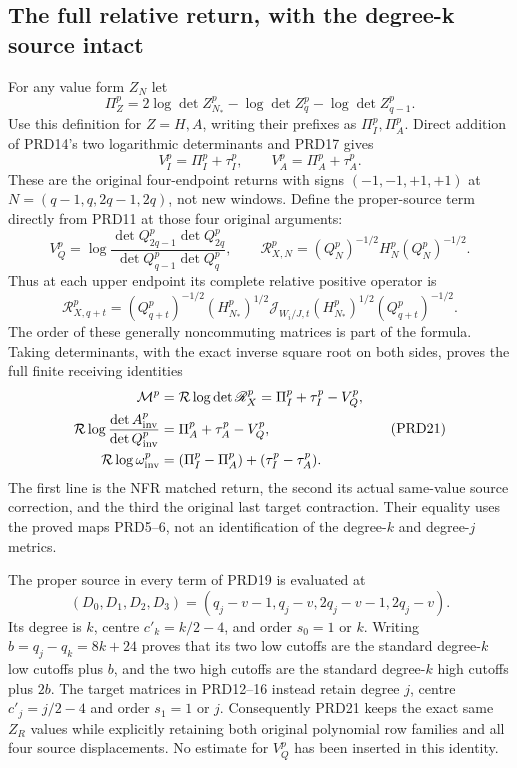 \documentclass[11pt,a4paper]{article}
\begin{document}
\subsection{The full relative return, with the degree-k source intact}
For any value form $Z_N$ let
\[
 \Pi_Z^p=2\log\det Z_{N_*}^p-\log\det Z_q^p
                            -\log\det Z_{q-1}^p.
                                                               \tag{PRD17}
\]
Use this definition for $Z=H,A$, writing their prefixes as
$\Pi_I^p,\Pi_A^p$. Direct addition of PRD14's two logarithmic
determinants and PRD17 gives
\[
 V_I^p=\Pi_I^p+\tau_I^p,\qquad
 V_A^p=\Pi_A^p+\tau_A^p.                                \tag{PRD18}
\]
These are the original four-endpoint returns with signs
$(-1,-1,+1,+1)$ at $N=(q-1,q,2q-1,2q)$, not new windows.
Define the proper-source term directly from PRD11 at those four
original arguments:
\[
 V_Q^p=\log\frac{\det Q_{2q-1}^p\det Q_{2q}^p}
                         {\det Q_{q-1}^p\det Q_q^p},
 \qquad \mathscr R_{X,N}^p=(Q_N^p)^{-1/2}H_N^p(Q_N^p)^{-1/2}.
                                                               \tag{PRD19}
\]
Thus at each upper endpoint its complete relative positive operator is
\[
 \mathscr R_{X,q+t}^p
 =(Q_{q+t}^p)^{-1/2}(H_{N_*}^p)^{1/2}
 \mathcal J_{W_i/J,t}(H_{N_*}^p)^{1/2}(Q_{q+t}^p)^{-1/2}.
                                                               \tag{PRD20}
\]
The order of these generally noncommuting matrices is part of the
formula. Taking determinants, with the exact inverse square root
on both sides, proves the full finite receiving identities
\[
\begin{aligned}
 \mathcal M^p&=\mathcal R\log\det\mathscr R_X^p
                 =\Pi_I^p+\tau_I^p-V_Q^p,\\
 \mathcal R\log\frac{\det A_{\rm inv}^p}{\det Q_{\rm inv}^p}
               &=\Pi_A^p+\tau_A^p-V_Q^p,\\
 \mathcal R\log\omega_{\rm inv}^p
               &=(\Pi_I^p-\Pi_A^p)+(\tau_I^p-\tau_A^p).
\end{aligned}                                                    \tag{PRD21}
\]
The first line is the NFR matched return, the second its actual
same-value source correction, and the third the original last
target contraction. Their equality uses the proved maps PRD5--6,
not an identification of the degree-$k$ and degree-$j$ metrics.

The proper source in every term of PRD19 is evaluated at
\[
 (D_0,D_1,D_2,D_3)=(q_j-v-1,q_j-v,2q_j-v-1,2q_j-v).
                                                               \tag{PRD22}
\]
Its degree is $k$, centre $c'_k=k/2-4$, and order $s_0=1$ or $k$.
Writing $b=q_j-q_k=8k+24$ proves that its two low cutoffs are
the standard degree-$k$ low cutoffs plus $b$, and the two high
cutoffs are the standard degree-$k$ high cutoffs plus $2b$.
The target matrices in PRD12--16 instead retain degree $j$,
centre $c'_j=j/2-4$ and order $s_1=1$ or $j$. Consequently
PRD21 keeps the exact same $Z_R$ values while explicitly
retaining both original polynomial row families and all four
source displacements. No estimate for $V_Q^p$ has been inserted
in this identity.
\end{document}
